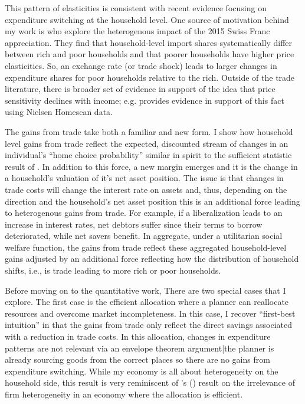 \documentclass[12pt,pdftex]{article}
\def\citeapos#1{\citeauthor{#1}'s (\citeyear{#1})}
\begin{document}
\begin{onehalfspacing}
This pattern of elasticities is consistent with recent evidence focusing on expenditure switching at the household level. One source of motivation behind my work is \citet*{auer2022unequal} who explore the heterogenous impact of the 2015 Swiss Franc appreciation. They find that household-level import shares systematically differ between rich and poor households and that poorer households have higher price elasticities. So, an exchange rate (or trade shock) leads to larger changes in expenditure shares for poor households relative to the rich. Outside of the trade literature, there is broader set of evidence in support of the idea that price sensitivity declines with income; e.g. \citet{sangani2022markups} provides evidence in support of this fact using Nielsen Homescan data.

The gains from trade take both a familiar and new form. I show how household level gains from trade reflect the expected, discounted stream of changes in an individual's ``home choice probability''  similar in spirit to the sufficient statistic result of \citet*{arkolakis2012new}. In addition to this force, a new margin emerges and it is the change in a household's valuation of it's net asset position. The issue is that changes in trade costs will change the interest rate on assets and, thus, depending on the direction and the household's net asset position this is an additional force leading to heterogenous gains from trade. For example, if a liberalization leads to an increase in interest rates, net debtors suffer since their terms to borrow deteriorated, while net savers benefit. In aggregate, under a utilitarian social welfare function, the gains from trade reflect these aggregated household-level gains adjusted by an additional force reflecting how the distribution of household shifts, i.e., is trade leading to more rich or poor households.

Before moving on to the quantitative work, There are two special cases that I explore. The first case is the efficient allocation where a planner can reallocate resources and overcome market incompleteness. In this case, I recover ``first-best intuition'' in that the gains from trade only reflect the direct savings associated with a reduction in trade costs. In this allocation, changes in expenditure patterns are not relevant via an envelope theorem argument|the planner is already sourcing goods from the correct places so there are no gains from expenditure switching. While my economy is all about heterogeneity on the household side, this result is very reminiscent of \citeapos{AtkesonBurstein2010} result on the irrelevance of firm heterogeneity in an economy where the allocation is efficient.


\end{onehalfspacing}
\end{document}
